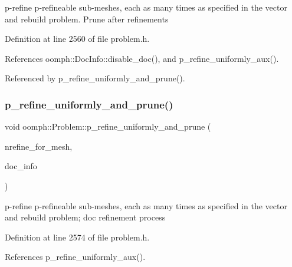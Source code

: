 p-\/refine p-\/refineable sub-\/meshes, each as many times as specified in the vector and rebuild problem. Prune after refinements 



Definition at line 2560 of file problem.\+h.



References oomph\+::\+Doc\+Info\+::disable\+\_\+doc(), and p\+\_\+refine\+\_\+uniformly\+\_\+aux().



Referenced by p\+\_\+refine\+\_\+uniformly\+\_\+and\+\_\+prune().

\mbox{\label{classoomph_1_1Problem_aabfa653ef203edf44cf9b6cf558865e1}} 
\subsubsection{\texorpdfstring{p\+\_\+refine\+\_\+uniformly\+\_\+and\+\_\+prune()}{p\_refine\_uniformly\_and\_prune()}\hspace{0.1cm}{\footnotesize\ttfamily [2/3]}}
{\footnotesize\ttfamily void oomph\+::\+Problem\+::p\+\_\+refine\+\_\+uniformly\+\_\+and\+\_\+prune (\begin{DoxyParamCaption}\item[{const \hyperlink{classoomph_1_1Vector}{Vector}$<$ unsigned $>$ \&}]{nrefine\+\_\+for\+\_\+mesh,  }\item[{\hyperlink{classoomph_1_1DocInfo}{Doc\+Info} \&}]{doc\+\_\+info }\end{DoxyParamCaption})\hspace{0.3cm}{\ttfamily [inline]}}



p-\/refine p-\/refineable sub-\/meshes, each as many times as specified in the vector and rebuild problem; doc refinement process 



Definition at line 2574 of file problem.\+h.



References p\+\_\+refine\+\_\+uniformly\+\_\+aux().

\mbox{\label{classoomph_1_1Problem_a80ff24a4fc923660f2aabfaa763822bf}} 
